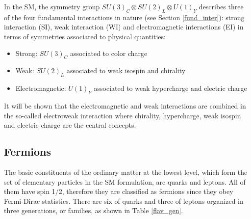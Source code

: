 In the SM, the symmetry group $SU(3)_C\otimes SU(2)_L\otimes U(1)_Y$ describes three of the four fundamental interactions in nature (see Section \ref{fund_inter}): strong interaction (SI), weak interaction (WI) and electromagnetic interactions (EI) in terms of symmetries associated to physical quantities:
\begin{itemize}
\item Strong: $SU(3)_C$ associated to color charge
\item Weak: $SU(2)_L$ associated to weak isospin and chirality
\item Electromagnetic: $U(1)_Y$ associated to weak hypercharge and electric charge
\end{itemize}

It will be shown that the electromagnetic and weak interactions are combined in the so-called electroweak interaction where chirality, hypercharge, weak isospin and electric charge are the central concepts.

\subsection{Fermions}\label{fermions}

The basic constituents of the ordinary matter at the lowest level, which form the set of elementary particles in the SM formulation, are quarks and leptons. All of them have spin 1/2, therefore they are classified as fermions since they obey Fermi-Dirac statistics. There are six  of quarks and three of leptons organized in three generations, or families, as shown in Table \ref{flav_gen}.\\
 
